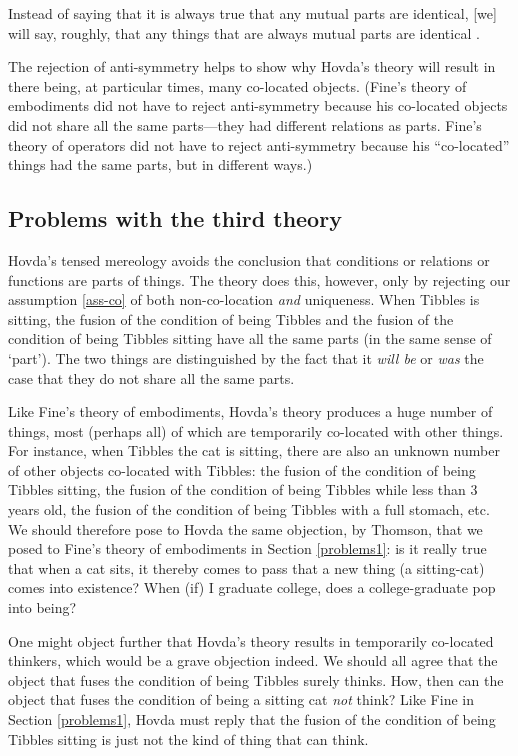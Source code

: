 \documentclass[12pt,twoside]{reedfancy}
\newenvironment{squote}{%
	\begin{spacing}{1}
	\begin{list}{}{%
	\setlength{\labelwidth}{0pt}%
	\rightmargin\leftmargin%
	}
	\item\relax
	}{%
	\end{list}%
	\end{spacing}
	}
\begin{document}
\begin{spacing}{1.25}
\begin{squote}
Instead of saying that it is always true that any mutual parts are
identical, [we] will say, roughly, that any things that are always
mutual parts are identical \citep[sec. 3.1.2]{hovda2011}.
\end{squote}

The rejection of anti-symmetry helps to show why Hovda's theory will
result in there being, at particular times, many co-located objects.
(Fine's theory of embodiments did not have to reject anti-symmetry
because his co-located objects did not share all the same parts---they
had different relations as parts.  Fine's theory of operators did not
have to reject anti-symmetry because his ``co-located'' things had the
same parts, but in different ways.)

\subsection{Problems with the third theory}
\label{problems3}
Hovda's tensed mereology avoids the conclusion that conditions or
relations or functions are parts of things.  The theory does this,
however, only by rejecting our assumption \ref{ass-co} of both
non-co-location {\em and} uniqueness.  When Tibbles is sitting, the
fusion of the condition of being Tibbles and the fusion of the
condition of being Tibbles sitting have all the same parts (in the
same sense of `part').  The two things are distinguished by the fact
that it {\em will be} or {\em was} the case that they do not share all
the same parts.

Like Fine's theory of embodiments, Hovda's theory produces a huge
number of things, most (perhaps all) of which are temporarily
co-located with other things.  For instance, when Tibbles the cat is
sitting, there are also an unknown number of other objects co-located
with Tibbles: the fusion of the condition of being Tibbles sitting,
the fusion of the condition of being Tibbles while less than 3 years
old, the fusion of the condition of being Tibbles with a full stomach,
etc.  We should therefore pose to Hovda the same objection, by
Thomson, that we posed to Fine's theory of embodiments in Section
\ref{problems1}: is it really true that when a cat sits, it thereby
comes to pass that a new thing (a sitting-cat) comes into existence?
When (if) I graduate college, does a college-graduate pop into being?

One might object further that Hovda's theory results in temporarily
co-located thinkers, which would be a grave objection indeed.  We
should all agree that the object that fuses the condition of being
Tibbles surely thinks.  How, then can the object that fuses the
condition of being a sitting cat {\em not} think?  Like Fine in
Section \ref{problems1}, Hovda must reply that the fusion of the
condition of being Tibbles sitting is just not the kind of thing that
can think.


\end{spacing}
\end{document}

